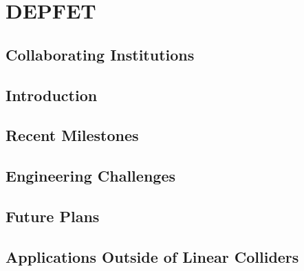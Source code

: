 \section{DEPFET}
\subsection{Collaborating Institutions}
\subsection{Introduction}
\subsection{Recent Milestones}
\subsection{Engineering Challenges}
\subsection{Future Plans}
\subsection{Applications Outside of Linear Colliders}
